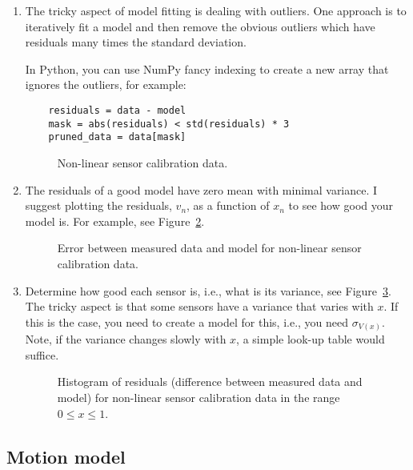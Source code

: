 \documentclass[a4paper, 12pt]{article}
\newcommand{\std}[1]{\sigma_{#1}}
\newcommand{\reffig}[1]{\mbox{Figure~\ref{fig:#1}}}
\begin{document}
\begin{enumerate}
\item The tricky aspect of model fitting is dealing with outliers.
  One approach is to iteratively fit a model and then remove the
  obvious outliers which have residuals many times the standard
  deviation.

  In Python, you can use NumPy fancy indexing to create a new array that
  ignores the outliers, for example:

  \begin{verbatim}
    residuals = data - model
    mask = abs(residuals) < std(residuals) * 3
    pruned_data = data[mask]
  \end{verbatim}


  \begin{figure}[!h]
  \centering
  
  \caption{Non-linear sensor calibration data.}
  \label{fig:fit}
  \end{figure}

  \item The residuals of a good model have zero mean with minimal
    variance.  I suggest plotting the residuals, $v_n$, as a function of
    $x_n$ to see how good your model is.  For example, see
    \reffig{residuals}.

    \begin{figure}[!h]
  \centering
  
  \caption{Error between measured data and model for non-linear sensor
    calibration data.}
  \label{fig:residuals}
  \end{figure}

\item Determine how good each sensor is, i.e., what is its variance,
  see \reffig{histogram}.  The tricky aspect is that some sensors have
  a variance that varies with $x$.  If this is the case, you need to
  create a model for this, i.e., you need $\std{V(x)}$.  Note, if the
  variance changes slowly with $x$, a simple look-up table would
  suffice.

  \begin{figure}[!h]
  \centering
  
  \caption{Histogram of residuals (difference between measured data
    and model) for non-linear sensor calibration data in the range $0
    \le x \le 1$.}
  \label{fig:histogram}
  \end{figure}

\end{enumerate}


\subsection{Motion model}
\end{document}
